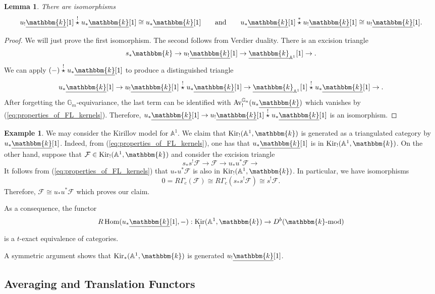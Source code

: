 \documentclass{amsart}
\newcommand{\A}{\mathbb{A}}
\newcommand{\G}{\mathbb{G}}
\renewcommand{\k}{\mathbbm{k}}
\newcommand{\scrF}{\mathcal{F}}
\DeclareMathOperator{\Hom}{Hom}
\renewcommand{\mod}[1]{#1\textnormal{-mod}}
\DeclareMathOperator{\Av}{Av}
\newcommand{\uk}{\underline{\k}}
\DeclareMathOperator{\Kir}{Kir}
\newcommand{\sstar}{\stackrel{*}{\star}}
\newcommand{\cstar}{\stackrel{!}{\star}}
\newtheorem{lemma}[subsubsection]{Lemma}
\theoremstyle{definition}
\newtheorem{example}[subsubsection]{Example}
\begin{document}
    \begin{lemma}\label{lem:two_out_of_three}
        There are isomorphisms
        \[u_! \uk [1] \cstar u_* \uk [1] \cong u_* \uk [1] \qquad\text{and}\qquad u_* \uk [1] \sstar u_! \uk [1] \cong u_! \uk [1].\]
    \end{lemma}
    \begin{proof}
        We will just prove the first isomorphism. The second follows from Verdier duality.
        There is an excision triangle
        \[s_* \k \to u_! \uk [1] \to \uk_{\A^1} [1] \to.\]
        We can apply $(-) \cstar u_* \uk [1]$ to produce a distinguished triangle
        \[u_* \uk [1] \to u_! \uk [1] \cstar u_* \uk [1] \to \uk_{\A^1} [1] \cstar u_* \uk [1] \to.  \]
        After forgetting the $\G_m$-equivariance, the last term can be identified with $\Av^{\G_a}_! (u_* \uk)$ which vanishes by (\ref{eq:properties_of_FL_kernels}).
        Therefore, $u_* \uk [1] \to u_! \uk [1] \cstar u_* \uk [1]$ is an isomorphism.
    \end{proof}

    \begin{example}\label{ex:kir_on_A1}
        We may consider the Kirillov model for $\A^1$. We claim that $\Kir_! (\A^1, \k)$ is generated as a triangulated category by $u_* \uk [1]$.
        Indeed, from (\ref{eq:properties_of_FL_kernels}), one has that $u_* \uk [1]$ is in $\Kir_! (\A^1, \k)$.
        On the other hand, suppose that $\scrF \in \Kir_! (\A^1, \k)$ and consider the excision triangle
        \[s_* s^! \scrF \to \scrF \to u_* u^* \scrF \to \] 
        It follows from (\ref{eq:properties_of_FL_kernels}) that $u_* u^* \scrF$ is also in $\Kir_! (\A^1, \k)$.
        In particular, we have isomorphisms
        \[0 = R\Gamma_c (\scrF) \cong R\Gamma_c (s_* s^! \scrF) \cong s^! \scrF.\]
        Therefore, $\scrF \cong u_* u^* \scrF$ which proves our claim.

        As a consequence, the functor
        \[ R\Hom (u_* \uk [1], -) : \Kir_! (\A^1, \k) \to D^b (\mod{\k})\]
        is a $t$-exact equivalence of categories.

        A symmetric argument shows that $\Kir_* (\A^1, \k)$ is generated $u_! \uk [1]$.
    \end{example}

    \subsection{Averaging and Translation Functors}
\end{document}
